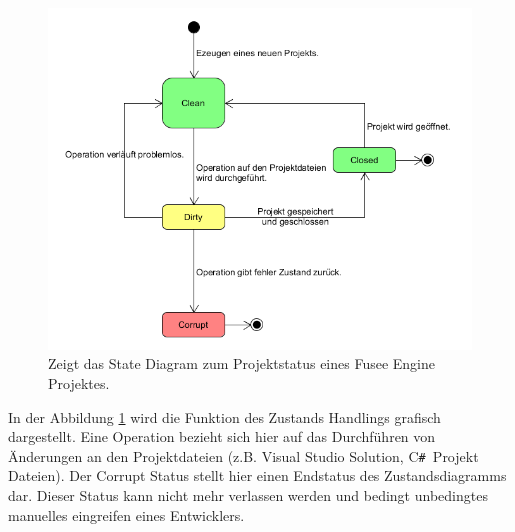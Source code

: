 \documentclass[pagesize, paper=a4, fontsize=12pt, titlepage=true, headings=small, headnosepline, abstractoff, liststotoc, nochapterprefix, plainheadsepline, twoside]{scrreprt}
\newcommand{\CSS}{C\texttt{\# }}
\begin{document}
\begin{figure}[ht]
	\centering
	\includegraphics[width=14cm]{Bilder/ProjektStatus.png}
	\caption{Zeigt das State Diagram zum Projektstatus eines Fusee Engine Projektes.}
	\label{FuseeProjektStatus}
\end{figure}

In der Abbildung \ref{FuseeProjektStatus} wird die Funktion des Zustands Handlings grafisch dargestellt. Eine Operation bezieht sich hier auf das Durchführen von Änderungen an den Projektdateien (z.B. Visual Studio Solution, \CSS Projekt Dateien). Der Corrupt Status stellt hier einen Endstatus des Zustandsdiagramms dar. Dieser Status kann nicht mehr verlassen werden und bedingt unbedingtes manuelles eingreifen eines Entwicklers.



\end{document}
